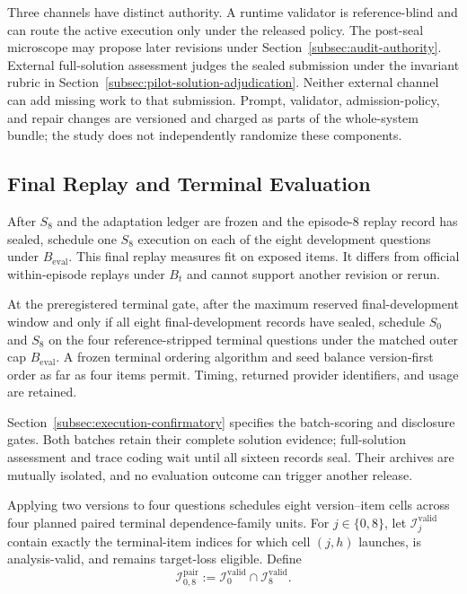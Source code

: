 \documentclass[10pt]{article} %
\providecommand{\1}{\mathbf{1}}  %
\theoremstyle{remark}
\theoremstyle{definition}
\begin{document}
\label{subsec:pilot-runtime-assurance}

Three channels have distinct authority. A runtime validator is reference-blind
and can route the active execution only under the released policy. The
post-seal microscope may propose later revisions under
Section~\ref{subsec:audit-authority}. External full-solution assessment judges
the sealed submission under the invariant rubric in
Section~\ref{subsec:pilot-solution-adjudication}. Neither external channel can
add missing work to that submission. Prompt, validator, admission-policy,
and repair changes are versioned and charged as parts of the whole-system
bundle; the study does not independently randomize these components.

\subsection{Final Replay and Terminal Evaluation}

\label{subsec:pilot-final-replay-terminal}

After $S_8$ and the adaptation ledger are frozen and the episode-8 replay
record has sealed, schedule one $S_8$ execution on each of the eight
development questions under $B_{\mathrm{eval}}$. This final replay measures
fit on exposed items. It differs from official within-episode replays under
$B_t$ and cannot support another revision or rerun.

At the preregistered terminal gate, after the maximum reserved
final-development window and only if all eight final-development records
have sealed, schedule $S_0$ and $S_8$ on the four reference-stripped terminal
questions under the matched outer cap $B_{\mathrm{eval}}$. A frozen terminal
ordering algorithm and seed balance version-first order as far as four
items permit. Timing, returned provider identifiers, and usage are retained.

Section~\ref{subsec:execution-confirmatory} specifies the batch-scoring and
disclosure gates. Both batches retain their complete solution evidence;
full-solution assessment and trace coding wait until all sixteen records
seal. Their archives are mutually isolated, and no evaluation outcome can
trigger another release.

Applying two versions to four questions schedules eight version--item cells across four planned paired terminal dependence-family units. For $j\in\{0,8\}$, let $\mathcal I_j^{\mathrm{valid}}$ contain exactly the terminal-item indices for which cell $(j,h)$ launches, is analysis-valid, and remains target-loss eligible. Define
\begin{equation}
\mathcal I_{0,8}^{\mathrm{pair}}
:=
\mathcal I_0^{\mathrm{valid}}\cap\mathcal I_8^{\mathrm{valid}}.
\end{equation}
\end{document}

